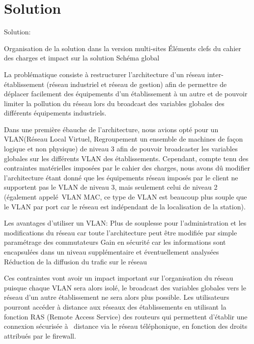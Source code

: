 \documentclass [a4paper] {report}
\begin{document}
\section{Solution}




Solution:

Organisation de la solution dans la version multi-sites
Éléments clefs du cahier des charges et impact sur la solution
Schéma global

La problématique consiste à restructurer l'architecture d'un réseau inter-établissement (réseau industriel et réseau de gestion) afin de permettre de déplacer facilement des équipements d'un établissement à un autre et de pouvoir limiter la pollution du réseau lors du broadcast des variables globales des différents équipements industriels.

Dans une première ébauche de l'architecture, nous avions opté pour un VLAN(Réseau Local Virtuel, Regroupement un ensemble de machines de façon logique et non physique) de niveau 3 afin de pouvoir broadcaster les variables globales sur les différents VLAN des établissements. Cependant, compte tenu des contraintes matérielles imposées par le cahier des charges, nous avons dû modifier l'architecture étant donné que les équipements réseau imposés par le client ne supportent pas le VLAN de niveau 3, mais seulement celui de niveau 2 (également appelé VLAN MAC, ce type de VLAN est beaucoup plus souple  que le VLAN par port car le réseau est indépendant de la localisation de la station). 


Les avantages d'utiliser un VLAN:
Plus de souplesse pour l'administration et les modifications du réseau car toute l'architecture peut être modifiée par simple paramétrage des commutateurs
Gain en sécurité car les informations sont encapsulées dans un niveau supplémentaire et éventuellement analysées
Réduction de la diffusion du trafic sur le réseau

Ces contraintes vont avoir un impact important sur l'organisation du réseau puisque chaque VLAN sera alors isolé, le broadcast des variables globales vers le réseau d'un autre établissement ne sera alors plus possible. 
Les utilisateurs pourront accéder à distance aux réseaux des établissements en utilisant la fonction RAS (Remote Access Service) des routeurs qui permettent d'établir une connexion sécurisée à  distance via le réseau téléphonique, en fonction des droits attribués par le firewall. 
\end{document}
